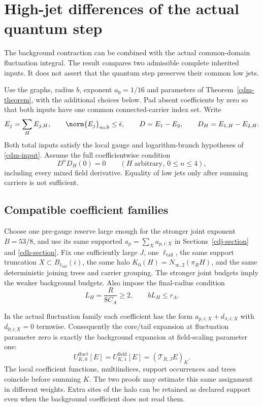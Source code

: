 \section{High-jet differences of the actual quantum step}
\label{cdq-section}

The background contraction can be combined with the actual
common-domain fluctuation integral. The result compares two
admissible complete inherited inputs. It does not assert that
the quantum step preserves their common low jets.

Use the graphs, radius $b$, exponent $a_0=1/16$ and parameters
of Theorem~\ref{cdm-theorem}, with the additional choices below.
Pad absent coefficients by zero so that both inputs have one
common connected-carrier index set. Write
\begin{equation}
 E_j=\sum_HE_{j,H},\qquad
 \norm{E_j}_{a_0;b}\le\bar\epsilon,\qquad
 D=E_1-E_2,\qquad D_H=E_{1,H}-E_{2,H}.
 \label{cdq-inputs}
\end{equation}
Both total inputs satisfy the local gauge and logarithm-branch
hypotheses of \eqref{cdm-input}. Assume the full coefficientwise
condition
\begin{equation}
 D^nD_H(0)=0\qquad(H\text{ arbitrary},\ 0\le n\le4),
 \label{cdq-common-jets}
\end{equation}
including every mixed field derivative. Equality of low jets
only after summing carriers is not sufficient.

\subsection{Compatible coefficient families}
\label{cdq-compatibility-section}

Choose one pre-gauge reserve large enough for the stronger
joint exponent $B=53/8$, and use its same supported
$a_p=\sum_Xa_{p,i;X}$ in Sections~\ref{cdj-section} and
\ref{cdh-section}. Fix one sufficiently large $J$, one
$\ell_{\mathrm{tail}}$, the same support truncation
$X\subset B_{\ell_{\mathrm{tail}}}(i)$, the same halo
$K_0(H)=N_{\infty,2}(\pi_RH)$, and the same deterministic
joining trees and carrier grouping. The stronger joint
budgets imply the weaker background budgets.
Also impose the final-radius condition
\begin{equation}
 L_H=\frac{R}{8C_A}\ge2,\qquad bL_H\le r_A.
 \label{cdq-high-disk}
\end{equation}

In the actual fluctuation family each coefficient has the
form $a_{p,i;X}+d_{\lambda;i;X}$ with
$d_{0;i;X}=0$ termwise. Consequently the core/tail expansion
at fluctuation parameter zero is exactly the background
expansion at field-scaling parameter one:
\begin{equation}
 U^{\mathrm{fluct}}_{K,0}[E]
   =U^{\mathrm{field}}_{K,1}[E]
   =(\mathcal T_{R,J}E)_K.
 \label{cdq-background-identity}
\end{equation}
The local coefficient functions, multiindices, support
occurrences and trees coincide before summing $K$.
The two proofs may estimate this same assignment in different
weights. Extra sites of the halo can be retained as declared
support even when the background coefficient does not read them.

